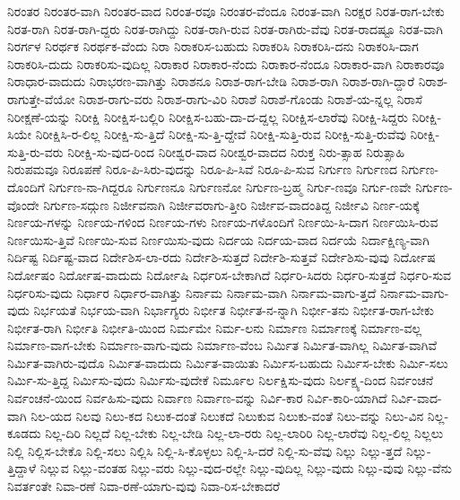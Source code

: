 {ನಿರಂತರ
ನಿರಂತರ-ವಾಗಿ
ನಿರಂತರ-ವಾದ
ನಿರಂತ-ರವೂ
ನಿರಂತರ-ವೆಂದೂ
ನಿರಂತ-ವಾಗಿ
ನಿರಕ್ಷರ
ನಿರತ-ರಾಗ-ಬೇಕು
ನಿರತ-ರಾಗಿ
ನಿರತ-ರಾಗಿ-ದ್ದರು
ನಿರತ-ರಾಗಿದ್ದು
ನಿರತ-ರಾಗಿ-ರುವ
ನಿರತ-ರಾಗಿರು-ವೆವು
ನಿರತ-ರಾದಷ್ಟೂ
ನಿರತ-ವಾಗಿ
ನಿರರ್ಗಳ
ನಿರರ್ಥಕ
ನಿರರ್ಥಕ-ವೆಂದು
ನಿರಾ
ನಿರಾಕರಿಸ-ಬಹುದು
ನಿರಾಕರಿಸಿ
ನಿರಾಕರಿಸಿ-ದನು
ನಿರಾಕರಿಸಿ-ದಾಗ
ನಿರಾಕರಿಸಿ-ದುದು
ನಿರಾಕರಿಸು-ವುದಿಲ್ಲ
ನಿರಾಕಾರ
ನಿರಾಕಾರ-ನೆಂದು
ನಿರಾಕಾರ-ನೆಂದೂ
ನಿರಾಕಾರ-ವಾಗಿ
ನಿರಾಕಾರವೂ
ನಿರಾಧಾರ-ವಾದುದು
ನಿರಾಭರಣ-ವಾಗಿತ್ತು
ನಿರಾಶನೂ
ನಿರಾಶ-ರಾಗ-ಬೇಡಿ
ನಿರಾಶ-ರಾಗಿ
ನಿರಾಶ-ರಾಗಿ-ದ್ದಾರೆ
ನಿರಾಶ-ರಾಗುತ್ತೇ-ವೆಯೋ
ನಿರಾಶ-ರಾಗು-ವರು
ನಿರಾಶ-ರಾಗು-ವಿರಿ
ನಿರಾಶೆ
ನಿರಾಶೆ-ಗೊಂಡು
ನಿರಾಶೆ-ಯ-ನ್ನಲ್ಲ
ನಿರಾಸೆ
ನಿರೀಕ್ಷಣೆ-ಯನ್ನು
ನಿರೀಕ್ಷಿ
ನಿರೀಕ್ಷಿಸ-ಬಲ್ಲಿರಿ
ನಿರೀಕ್ಷಿಸ-ಬಹು-ದಾ-ದ-ದ್ದಲ್ಲ
ನಿರೀಕ್ಷಿಸ-ಲಾರೆವು
ನಿರೀಕ್ಷಿ-ಸಿದ್ದರು
ನಿರೀಕ್ಷಿ-ಸಿಯೇ
ನಿರೀಕ್ಷಿಸಿ-ರ-ಲಿಲ್ಲ
ನಿರೀಕ್ಷಿ-ಸು-ತ್ತಿದೆ
ನಿರೀಕ್ಷಿ-ಸು-ತ್ತಿ-ದ್ದೇವೆ
ನಿರೀಕ್ಷಿ-ಸುತ್ತಿ-ರುವ
ನಿರೀಕ್ಷಿ-ಸುತ್ತಿ-ರುವೆವು
ನಿರೀಕ್ಷಿ-ಸುತ್ತಿ-ರು-ವರು
ನಿರೀಕ್ಷಿ-ಸು-ವುದ-ರಿಂದ
ನಿರೀಶ್ವರ-ವಾದ
ನಿರೀಶ್ವರ-ವಾದದ
ನಿರುಕ್ತ
ನಿರು-ತ್ಸಾಹ
ನಿರುತ್ಸಾಹಿ
ನಿರುಪಮವೂ
ನಿರೂಪಣೆ
ನಿರೂ-ಪಿ-ಸಿರು-ವುದನ್ನು
ನಿರೂ-ಪಿ-ಸಿವೆ
ನಿರೂ-ಪಿ-ಸುವ
ನಿರ್ಗುಣ
ನಿರ್ಗುಣದ
ನಿರ್ಗುಣ-ದೊಂದಿಗೆ
ನಿರ್ಗುಣ-ನಾ-ಗಿದ್ದರೂ
ನಿರ್ಗುಣನೂ
ನಿರ್ಗುಣನೋ
ನಿರ್ಗುಣ-ಬ್ರಹ್ಮ
ನಿರ್ಗು-ಣವೂ
ನಿರ್ಗು-ಣವೇ
ನಿರ್ಗುಣ-ವೊಂದೇ
ನಿರ್ಗುಣ-ಸದ್ಗುಣ
ನಿರ್ಜೀವನಾಗಿ
ನಿರ್ಜೀವರಾಗು-ತ್ತೀರಿ
ನಿರ್ಜೀವ-ವಾದಂತಿದ್ದ
ನಿರ್ಜೀವಿ
ನಿರ್ಣ-ಯಕ್ಕೆ
ನಿರ್ಣಯ-ಗಳನ್ನು
ನಿರ್ಣಯ-ಗಳಿಂದ
ನಿರ್ಣಯ-ಗಳು
ನಿರ್ಣಯ-ಗಳೊಂದಿಗೆ
ನಿರ್ಣಯಿ-ಸಿ-ದಾಗ
ನಿರ್ಣಯಿಸಿ-ರುವ
ನಿರ್ಣಯಿಸು-ತ್ತಿವೆ
ನಿರ್ಣಯಿ-ಸುವ
ನಿರ್ಣಯಿಸು-ವುದು
ನಿರ್ದಯ
ನಿರ್ದಯ-ವಾದ
ನಿರ್ದಯೆ
ನಿರ್ದಾಕ್ಷಿಣ್ಯ-ವಾಗಿ
ನಿರ್ದಿಷ್ಟ
ನಿರ್ದಿಷ್ಟ-ವಾದ
ನಿರ್ದೇಶಿಸ-ಲಾ-ರದು
ನಿರ್ದೇಶಿ-ಸುತ್ತದೆ
ನಿರ್ದೇಶಿ-ಸುತ್ತವೆ
ನಿರ್ದೇಶಿಸು-ವುವು
ನಿರ್ದೋಷ
ನಿರ್ದೋಷಂ
ನಿರ್ದೋಷ-ವಾದುದು
ನಿರ್ದೋಷಿ
ನಿರ್ಧರಿಸ-ಬೇಕಾಗಿದೆ
ನಿರ್ಧರಿ-ಸಿದರು
ನಿರ್ಧರಿ-ಸುತ್ತದೆ
ನಿರ್ಧರಿ-ಸುವ
ನಿರ್ಧರಿಸು-ವುದು
ನಿರ್ಧಾರ
ನಿರ್ಧಾರ-ವಾಗಿತ್ತು
ನಿರ್ನಾಮ
ನಿರ್ನಾಮ-ವಾಗಿ
ನಿರ್ನಾಮ-ವಾಗು-ತ್ತದೆ
ನಿರ್ನಾಮ-ವಾಗು-ವುದು
ನಿರ್ಭಯತೆ
ನಿರ್ಭಯ-ವಾಗಿ
ನಿರ್ಭಾಗ್ಯರು
ನಿರ್ಭೀತ
ನಿರ್ಭೀತ-ನ-ನ್ನಾಗಿ
ನಿರ್ಭೀ-ತನು
ನಿರ್ಭೀತ-ರಾಗ-ಬೇಕು
ನಿರ್ಭೀತ-ರಾಗಿ
ನಿರ್ಭೀತಿ
ನಿರ್ಭೀತಿ-ಯಿಂದ
ನಿರ್ಮಮೇ
ನಿರ್ಮ-ಲನು
ನಿರ್ಮಾಣ
ನಿರ್ಮಾಣಕ್ಕೆ
ನಿರ್ಮಾಣ-ವಲ್ಲ
ನಿರ್ಮಾಣ-ವಾಗ-ಬೇಕು
ನಿರ್ಮಾಣ-ವಾಗು-ವುದು
ನಿರ್ಮಾಣ-ವೆಂಬ
ನಿರ್ಮಿತ
ನಿರ್ಮಿತ-ವಾಗಿಲ್ಲ
ನಿರ್ಮಿತ-ವಾಗಿವೆ
ನಿರ್ಮಿತ-ವಾಗಿರು-ವುದೊ
ನಿರ್ಮಿತ-ವಾದುದು
ನಿರ್ಮಿತ-ವಾಯಿತು
ನಿರ್ಮಿಸ-ಬಹುದು
ನಿರ್ಮಿಸ-ಬೇಕು
ನಿರ್ಮಿ-ಸಲು
ನಿರ್ಮಿ-ಸು-ತ್ತಿದ್ದ
ನಿರ್ಮಿಸು-ವುದು
ನಿರ್ಮಿಸು-ವುದೇಕೆ
ನಿರ್ಮೂಲ
ನಿರ್ಲಕ್ಷಿಸು-ವುದು
ನಿರ್ಲಕ್ಷ್ಯ-ದಿಂದ
ನಿರ್ವಂಚನೆ
ನಿರ್ವಂಚನೆ-ಯಿಂದ
ನಿರ್ವಹಿಸು-ವುದು
ನಿರ್ವಾಣ
ನಿರ್ವಾಣ-ವನ್ನು
ನಿರ್ವಿ-ಕಾರ
ನಿರ್ವಿ-ಕಾರಿ-ಯಾಗಿದೆ
ನಿರ್ವಿ-ವಾದ-ವಾಗಿ
ನಿಲ-ಯದ
ನಿಲವು
ನಿಲು-ಕದ
ನಿಲುಕ-ದಂತೆ
ನಿಲುಕದೆ
ನಿಲುಕುವ
ನಿಲುಕು-ವಂತೆ
ನಿಲು-ವನ್ನು
ನಿಲು-ವಿನ
ನಿಲ್ಲ-ಕೂಡದು
ನಿಲ್ಲ-ದಿರಿ
ನಿಲ್ಲದೆ
ನಿಲ್ಲ-ಬೇಕು
ನಿಲ್ಲ-ಬೇಡಿ
ನಿಲ್ಲ-ಲಾ-ರರು
ನಿಲ್ಲ-ಲಾರಿರಿ
ನಿಲ್ಲ-ಲಾರೆವು
ನಿಲ್ಲ-ಲಿಲ್ಲ
ನಿಲ್ಲಲು
ನಿಲ್ಲಿ
ನಿಲ್ಲಿಸ-ಬೇಕೊ
ನಿಲ್ಲಿ-ಸಲು
ನಿಲ್ಲಿಸಿ
ನಿಲ್ಲಿ-ಸಿ-ಕೊಳ್ಳಲು
ನಿಲ್ಲಿ-ಸಿ-ದರೆ
ನಿಲ್ಲಿ-ಸು-ವೆವು
ನಿಲ್ಲು
ನಿಲ್ಲು-ತ್ತದೆ
ನಿಲ್ಲು-ತ್ತಿದ್ದಾಳೆ
ನಿಲ್ಲುವ
ನಿಲ್ಲು-ವಂತಹ
ನಿಲ್ಲು-ವರು
ನಿಲ್ಲು-ವುದ-ರಲ್ಲೇ
ನಿಲ್ಲು-ವುದಿಲ್ಲ
ನಿಲ್ಲು-ವುದು
ನಿಲ್ಲು-ವುವು
ನಿಲ್ಲು-ವೆನು
ನಿವರ್ತಂತೇ
ನಿವಾ-ರಣೆ
ನಿವಾ-ರಣೆ-ಯಾಗು-ವುವು
ನಿವಾ-ರಿಸ-ಬೇಕಾದರೆ
}
